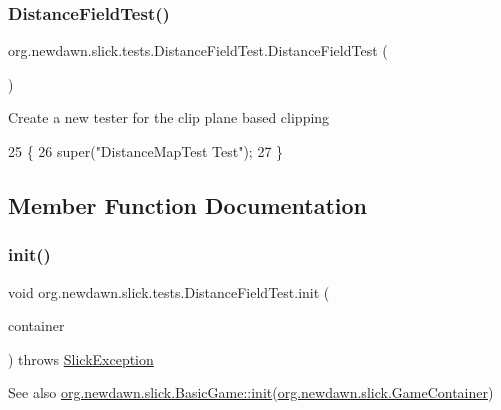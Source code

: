 \subsubsection{\texorpdfstring{Distance\+Field\+Test()}{DistanceFieldTest()}}
{\footnotesize\ttfamily org.\+newdawn.\+slick.\+tests.\+Distance\+Field\+Test.\+Distance\+Field\+Test (\begin{DoxyParamCaption}{ }\end{DoxyParamCaption})\hspace{0.3cm}{\ttfamily [inline]}}

Create a new tester for the clip plane based clipping 
\begin{DoxyCode}
25                                \{
26         super(\textcolor{stringliteral}{"DistanceMapTest Test"});
27     \}
\end{DoxyCode}


\subsection{Member Function Documentation}
\mbox{\label{classorg_1_1newdawn_1_1slick_1_1tests_1_1_distance_field_test_a1179a4d943fc72536ec70f48b83d99fc}} 
\subsubsection{\texorpdfstring{init()}{init()}}
{\footnotesize\ttfamily void org.\+newdawn.\+slick.\+tests.\+Distance\+Field\+Test.\+init (\begin{DoxyParamCaption}\item[{\mbox{\hyperlink{classorg_1_1newdawn_1_1slick_1_1_game_container}{Game\+Container}}}]{container }\end{DoxyParamCaption}) throws \mbox{\hyperlink{classorg_1_1newdawn_1_1slick_1_1_slick_exception}{Slick\+Exception}}\hspace{0.3cm}{\ttfamily [inline]}}

\begin{DoxySeeAlso}{See also}
\mbox{\hyperlink{classorg_1_1newdawn_1_1slick_1_1_basic_game_a8af0900217e4d389249f71367b22d114}{org.\+newdawn.\+slick.\+Basic\+Game\+::init}}(\mbox{\hyperlink{classorg_1_1newdawn_1_1slick_1_1_game_container}{org.\+newdawn.\+slick.\+Game\+Container}}) 
\end{DoxySeeAlso}



